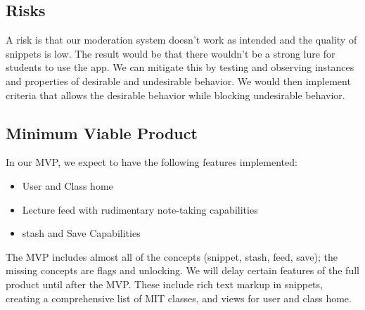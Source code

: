 \documentclass{article}
\begin{document}
\newpage

\subsection*{Risks}

A risk is that our moderation system doesn't work as intended and the quality of snippets is low. The result would be that there wouldn't be a strong lure for students to use the app. We can mitigate this by testing and observing instances and properties of desirable and undesirable behavior. We would then implement criteria that allows the desirable behavior while blocking undesirable behavior.

\subsection*{Minimum Viable Product}
In our MVP, we expect to have the following features implemented:
\begin{itemize}
\item User and Class home
\item Lecture feed with rudimentary note-taking capabilities
\item stash and Save Capabilities
\end{itemize}

The MVP includes almost all of the concepts (snippet, stash, feed, save); the missing concepts are flags and unlocking. We will delay certain features of the full product until after the MVP. These include rich text markup in snippets, creating a comprehensive list of MIT classes, and views for user and class home.
\end{document}

